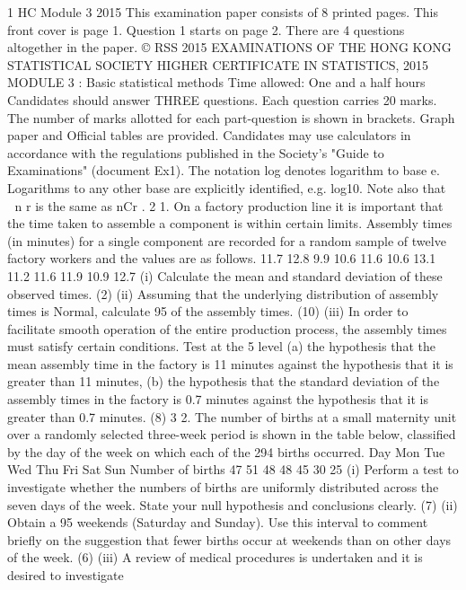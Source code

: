 1 HC Module 3 2015
This examination paper consists of 8 printed pages.
This front cover is page 1.
Question 1 starts on page 2.
There are 4 questions altogether in the paper.
© RSS 2015
EXAMINATIONS OF THE HONG KONG STATISTICAL SOCIETY
HIGHER CERTIFICATE IN STATISTICS, 2015
MODULE 3 : Basic statistical methods
Time allowed: One and a half hours
Candidates should answer THREE questions.
Each question carries 20 marks.
The number of marks allotted for each part-question is shown in brackets.
Graph paper and Official tables are provided.
Candidates may use calculators in accordance with the regulations published in
the Society's "Guide to Examinations" (document Ex1).
The notation log denotes logarithm to base e.
Logarithms to any other base are explicitly identified, e.g. log10.
Note also that
 
n
r
is the same as
nCr
.
2
1. On a factory production line it is important that the time taken to assemble a
component is within certain limits. Assembly times (in minutes) for a single
component are recorded for a random sample of twelve factory workers and the values
are as follows.
11.7 12.8 9.9 10.6 11.6 10.6 13.1 11.2 11.6 11.9 10.9 12.7
(i) Calculate the mean and standard deviation of these observed times.
(2)
(ii) Assuming that the underlying distribution of assembly times is Normal,
calculate 95%
of the assembly times.
(10)
(iii) In order to facilitate smooth operation of the entire production process, the
assembly times must satisfy certain conditions. Test at the 5%
level
(a) the hypothesis that the mean assembly time in the factory is 11 minutes
against the hypothesis that it is greater than 11 minutes,
(b) the hypothesis that the standard deviation of the assembly times in the
factory is 0.7 minutes against the hypothesis that it is greater than
0.7 minutes.
(8)
3
2. The number of births at a small maternity unit over a randomly selected three-week
period is shown in the table below, classified by the day of the week on which each of
the 294 births occurred.
Day Mon Tue Wed Thu Fri Sat Sun
Number of births 47 51 48 48 45 30 25
(i) Perform a test to investigate whether the numbers of births are uniformly
distributed across the seven days of the week. State your null hypothesis and
conclusions clearly.
(7)
(ii) Obtain a 95%
weekends (Saturday and Sunday). Use this interval to comment briefly on the
suggestion that fewer births occur at weekends than on other days of the week.
(6)
(iii) A review of medical procedures is undertaken and it is desired to investigate
